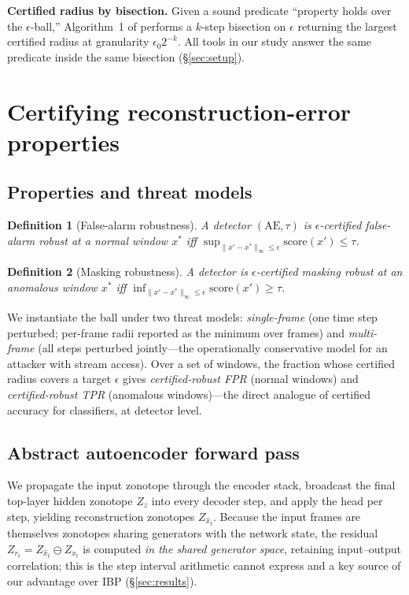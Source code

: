 \documentclass{article} %
\newtheorem{definition}{Definition}
\newcommand{\score}{\mathrm{score}}
\begin{document}
\textbf{Certified radius by bisection.} Given a sound predicate
``property holds over the $\epsilon$-ball,'' Algorithm~1 of
\citet{du2021certrnn} performs a $k$-step bisection on $\epsilon$
returning the largest certified radius at granularity
$\epsilon_0 2^{-k}$. All tools in our study answer the same predicate
inside the same bisection (\S\ref{sec:setup}).

\section{Certifying reconstruction-error properties}
\label{sec:method}

\subsection{Properties and threat models}

\begin{definition}[False-alarm robustness]
A detector $(\mathrm{AE},\tau)$ is $\epsilon$-certified
\emph{false-alarm robust} at a normal window $x^\ast$ iff
$\sup_{\lVert x' - x^\ast \rVert_\infty \le \epsilon} \score(x') \le \tau$.
\end{definition}

\begin{definition}[Masking robustness]
A detector is $\epsilon$-certified \emph{masking robust} at an
anomalous window $x^\ast$ iff
$\inf_{\lVert x' - x^\ast\rVert_\infty \le \epsilon} \score(x') \ge \tau$.
\end{definition}

We instantiate the ball under two threat models: \emph{single-frame}
(one time step perturbed; per-frame radii reported as the minimum over
frames) and \emph{multi-frame} (all steps perturbed jointly---the
operationally conservative model for an attacker with stream access).
Over a set of windows, the fraction whose certified radius covers a
target $\epsilon$ gives \emph{certified-robust FPR} (normal windows)
and \emph{certified-robust TPR} (anomalous windows)---the direct
analogue of certified accuracy for classifiers, at detector level.

\subsection{Abstract autoencoder forward pass}

We propagate the input zonotope through the encoder stack, broadcast
the final top-layer hidden zonotope $Z_z$ into every decoder step, and
apply the head per step, yielding reconstruction zonotopes
$Z_{\hat{x}_t}$. Because the input frames are themselves zonotopes
sharing generators with the network state, the residual
$Z_{r_t} = Z_{\hat{x}_t} \ominus Z_{x_t}$ is computed \emph{in the
shared generator space}, retaining input--output correlation; this is
the step interval arithmetic cannot express and a key source of our
advantage over IBP (\S\ref{sec:results}).
\end{document}
